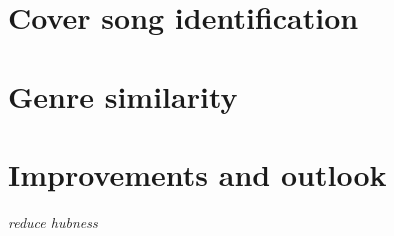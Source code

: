 \section{Cover song identification}

\section{Genre similarity}

\section{Improvements and outlook}

\textit{reduce hubness}


